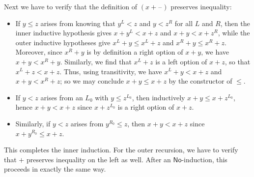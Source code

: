\documentclass[10pt,a4paper]{article}
\newcommand{\blank}{\mathord{\hspace{1pt}\text{--}\hspace{1pt}}}
\newcommand{\NO}{\ensuremath{\mathsf{No}}\xspace}
\theoremstyle{definition}
\theoremstyle{remark}
\numberwithin{equation}{section}
\begin{document}
\begin{eg}
Next we have to verify that the definition of $(x+\blank)$ preserves inequality:
\begin{itemize}
\item If $y\le z$ arises from knowing that $y^L<z$ and $y<z^R$ for all $L$ and $R$, then the inner inductive hypothesis gives $x+y^L<x+z$ and $x+y < x+z^R$, while the outer inductive hypotheses give $x^L+y \le x^L+z$ and $x^R+ y \le x^R+z$.
  Moreover, since $x^R+y$ is by definition a right option of $x+y$, we have $x+y < x^R+y$.
  Similarly, we find that $x^L+z$ is a left option of $x+z$, so that $x^L+z < x+z$.
  Thus, using transitivity, we have $x^L+y < x+z$ and $x+y < x^R+z$; so we may conclude $x+y \le x+z$ by the constructor of $\le$.
\item If $y<z$ arises from an $L_0$ with $y\le z^{L_0}$, then inductively $x+y \le x+z^{L_0}$, hence $x+y<x+z$ since $x+z^{L_0}$ is a right option of $x+z$.
\item Similarly, if $y<z$ arises from $y^{R_0}\le z$, then $x+y<x+z$ since $x+y^{R_0}\le x+z$.
\end{itemize}
This completes the inner induction.
For the outer recursion, we have to verify that $+$ preserves inequality on the left as well.
After an $\NO$-induction, this proceeds in exactly the same way.
\end{eg}



\end{document}
